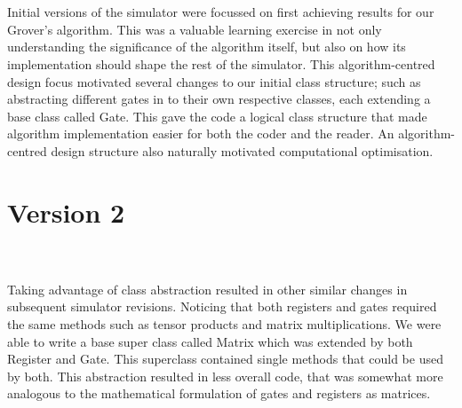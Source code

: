 \documentclass[12pt]{report}
\begin{document}
\\ \\
Initial versions of the simulator were focussed on first achieving results for our Grover's algorithm.       This was a valuable learning exercise in not only understanding the significance of the algorithm itself, but also on how its implementation should shape the rest of the simulator.  This algorithm-centred design focus motivated several changes to our initial class structure; such as abstracting different gates in to their own respective classes, each extending a base class called Gate.  This gave the code a logical class structure that made algorithm implementation easier for both the coder and the reader.  An algorithm-centred design structure also naturally motivated computational optimisation. 

\section{Version 2}


\\ \\ 
Taking advantage of class abstraction resulted in other similar changes in subsequent simulator revisions. Noticing that both registers and gates required the same methods such as tensor products and matrix multiplications. We were able to write a base super class called Matrix which was extended by both Register and Gate. This superclass contained single methods that could be used by both.  This abstraction resulted in less overall code, that was somewhat more analogous to the mathematical formulation of gates and registers as matrices. 
\end{document}
